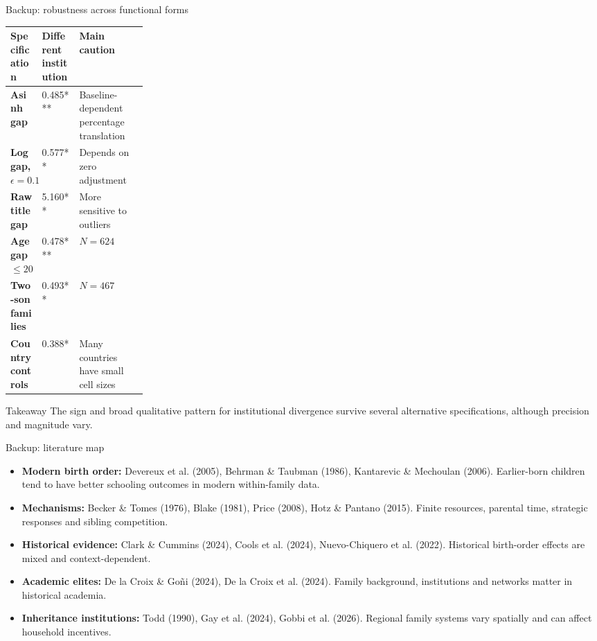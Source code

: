 \documentclass[aspectratio=169,10pt]{beamer}
\begin{document}
\begin{frame}{Backup: robustness across functional forms}
\small
\begin{tabularx}{\linewidth}{>{\bfseries}p{0.23\linewidth}X X}
\toprule
Specification & Different institution & Main caution\\
\midrule
Asinh gap & 0.485*** & Baseline-dependent percentage translation\\
Log gap, \(\epsilon=0.1\) & 0.577** & Depends on zero adjustment\\
Raw title gap & 5.160** & More sensitive to outliers\\
Age gap \(\leq20\) & 0.478*** & \(N=624\)\\
Two-son families & 0.493** & \(N=467\)\\
Country controls & 0.388* & Many countries have small cell sizes\\
\bottomrule
\end{tabularx}

\vspace{0.6em}
\begin{block}{Takeaway}
The sign and broad qualitative pattern for institutional divergence survive several alternative specifications, although precision and magnitude vary.
\end{block}
\end{frame}

\begin{frame}{Backup: literature map}
\begin{itemize}\setlength\itemsep{0.35em}
\item \textbf{Modern birth order:} Devereux et al. (2005), Behrman \& Taubman (1986), Kantarevic \& Mechoulan (2006). Earlier-born children tend to have better schooling outcomes in modern within-family data.
\item \textbf{Mechanisms:} Becker \& Tomes (1976), Blake (1981), Price (2008), Hotz \& Pantano (2015). Finite resources, parental time, strategic responses and sibling competition.
\item \textbf{Historical evidence:} Clark \& Cummins (2024), Cools et al. (2024), Nuevo-Chiquero et al. (2022). Historical birth-order effects are mixed and context-dependent.
\item \textbf{Academic elites:} De la Croix \& Goñi (2024), De la Croix et al. (2024). Family background, institutions and networks matter in historical academia.
\item \textbf{Inheritance institutions:} Todd (1990), Gay et al. (2024), Gobbi et al. (2026). Regional family systems vary spatially and can affect household incentives.
\end{itemize}
\end{frame}
\end{document}
